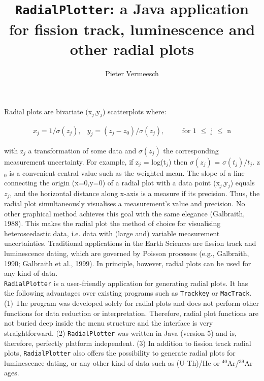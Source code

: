 \documentclass{article}
\author{Pieter Vermeesch}
\title{{\tt Radial\-Plotter}: a Java application for fission track,
luminescence and other radial plots}
\begin{document}
\maketitle

Radial plots are bivariate (x$_j$,y$_j$) scatterplots where:

\begin{eqnarray}
x_j = 1/\sigma(z_j), & y_j = (z_j-z_0)/\sigma(z_j), & 
\mbox{~~~~ for 1  $\leq$ j  $\leq$ n}
\label{eq:xjyj}
\end{eqnarray}

with z$_j$ a transformation of some data and $\sigma(z_j)$ the
corresponding measurement uncertainty.  For example, if z$_j$ =
log(t$_j$) then $\sigma(z_j)$ = $\sigma(t_j)/t_j$.  z$_0$ is a
convenient central value such as the weighted mean.  The slope of a
line connecting the origin (x=0,y=0) of a radial plot with a data
point (x$_j$,y$_j$) equals $z_j$, and the horizontal distance along
x-axis is a measure if its precision.  Thus, the radial plot
simultaneously visualises a measurement's value and precision.  No
other graphical method achieves this goal with the same elegance
(Galbraith, 1988).  This makes the radial plot the method of choice
for visualising heteroscedastic data, i.e.  data with (large and)
variable measurement uncertainties.  Traditional applications in the
Earth Sciences are fission track and luminescence dating, which are
governed by Poisson processes (e.g., Galbraith, 1990; Galbraith et
al., 1999).  In principle, however, radial plots can be used for any
kind of data.\\

{\tt RadialPlotter} is a user-friendly application for generating
radial plots.  It has the following advantages over existing programs
such as {\tt Track\-key} or {\tt Mac\-Track}.  (1) The program was
developed solely for radial plots and does not perform other functions
for data reduction or interpretation. Therefore, radial plot functions
are not buried deep inside the menu structure and the interface is
very straightforward.  (2) {\tt RadialPlotter} was written in Java
(version 5) and is, therefore, perfectly platform independent. (3) In
addition to fission track radial plots, {\tt RadialPlotter} also
offers the possibility to generate radial plots for luminescence
dating, or any other kind of data such as (U-Th)/He or
$^{40}$Ar/$^{39}$Ar ages.\\
\end{document}
